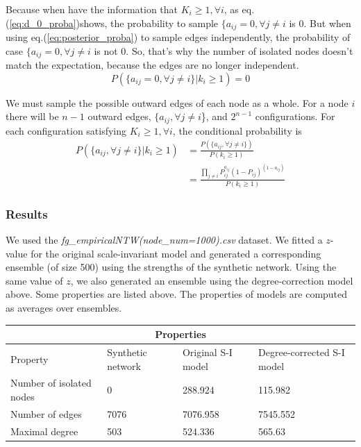 \documentclass{article}
\begin{document}
Because when have the information that $K_i\geq 1,\forall i$, as eq.(\ref{eq:d_0_proba})shows, the probability to sample $\{a_{ij}=0, \forall j \neq i$ is 0. But when using eq.(\ref{eq:posterior_proba}) to sample edges independently, the probability of case $\{a_{ij}=0, \forall j \neq i$ is not 0. So, that's why the number of isolated nodes doesn't match the expectation, because the edges are no longer independent. 
\begin{equation}
    P(\{a_{ij}=0, \forall j\neq i\}|k_i\geq 1) = 0
    \label{eq:d_0_proba}
\end{equation}

We must sample the possible outward edges of each node as a whole. For a node $i$ there will be $n-1$ outward edges, $\{a_{ij}, \forall j\neq i$\}, and $2^{n-1}$ configurations. For each configuration satisfying $K_i\geq 1,\forall i$, the conditional probability is
\begin{align}
    P(\{a_{ij}, \forall j\neq i\}|k_i\geq 1)
    &= \frac{P(\{a_{ij}, \forall j\neq i\})}{P(k_i\geq1)} \\
    &=\frac{ \prod_{j\neq i}P_{ij}^{a_{ij}}(1-P_{ij})^{(1-a_{ij})} }{P(k_i\geq1)}
\end{align}

\subsubsection{Results}
We used the \textit{fg\_empiricalNTW(node\_num=1000).csv} dataset. We fitted a $z$-value for the original scale-invariant model and generated a corresponding ensemble (of size 500) using the strengths of the synthetic network. Using the same value of $z$, we also generated an ensemble using the degree-correction model above. Some properties are listed above. The properties of models are computed as averages over ensembles.

\begin{table}
\centering
\begin{tabular}{ |p{3cm}||p{3cm}|p{3cm}|p{3cm}|  }
 \hline
 \multicolumn{4}{|c|}{Properties} \\
 \hline
 Property & Synthetic network & Original  S-I model & Degree-corrected S-I model\\
 \hline
 Number of isolated nodes   & 0    &288.924&   115.982\\
 Number of edges&   7076  & 7076.958   &7545.552\\
 Maximal degree &503 & 524.336&  565.63\\
 \hline
\end{tabular}
\end{table}
\end{document}
